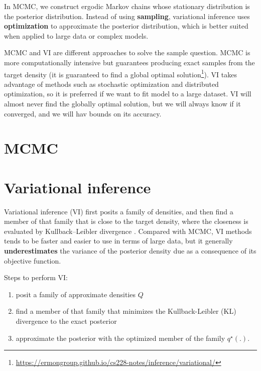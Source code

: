 \documentclass[fontset=fandol,zihao=false,scheme=chinese,heading=true,UTF8]{ctexbook}
\providecommand{\tightlist}{%
  \setlength{\itemsep}{0pt}\setlength{\parskip}{0pt}}
\begin{document}
In MCMC, we construct ergodic Markov chains whose stationary distribution is the posterior distribution. Instead of using \textbf{sampling}, variational inference uses \textbf{optimization} to approximate the posterior distribution, which is better suited when applied to large data or complex models.

MCMC and VI are different approaches to solve the sample question. MCMC is more computationally intensive but guarantees producing exact samples from the target density (it is guaranteed to find a global optimal solution\footnote{\url{https://ermongroup.github.io/cs228-notes/inference/variational/}}). VI takes advantage of methods such as stochastic optimization and distributed optimization, so it is preferred if we want to fit model to a large dataset. VI will almost never find the globally optimal solution, but we will always know if it converged, and we will hav bounds on its accuracy.

\hypertarget{mcmc}{%
\section{MCMC}\label{mcmc}}

\hypertarget{variational-inference}{%
\section{Variational inference}\label{variational-inference}}

Variational inference (VI) first posits a family of densities, and then find a member of that family that is close to the target density, where the closeness is evaluated by Kullback--Leibler divergence \citep{blei2017variational}. Compared with MCMC, VI methods tends to be faster and easier to use in terms of large data, but it generally \textbf{underestimates} the variance of the posterior density due as a consequence of its objective function.

Steps to perform VI:

\begin{enumerate}
\def\labelenumi{\arabic{enumi}.}
\tightlist
\item
  posit a family of approximate densities \(Q\)
\item
  find a member of that family that minimizes the Kullback-Leibler (KL) divergence to the exact posterior
\item
  approximate the posterior with the optimized member of the family \(q^{\star}(.)\).
\end{enumerate}
\end{document}

